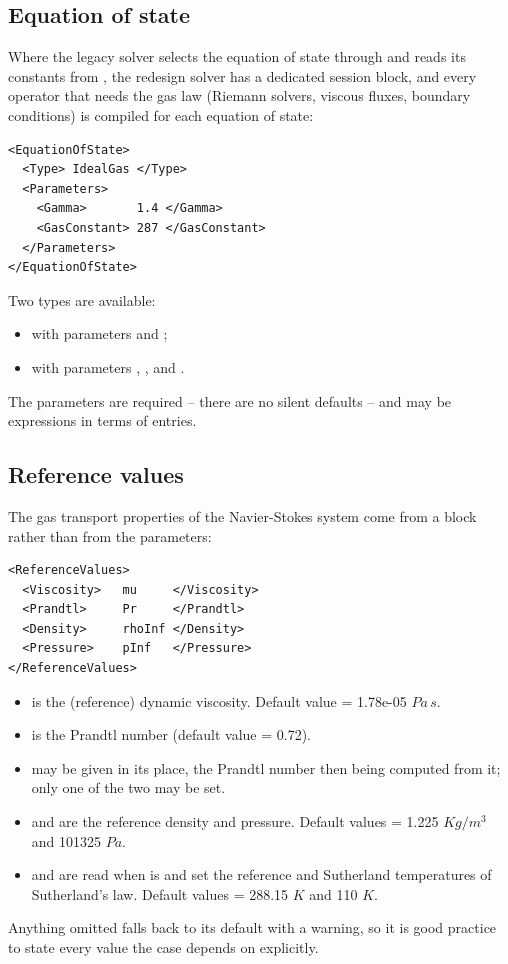 \subsection*{Equation of state}
Where the legacy solver selects the equation of state through
 and reads its constants from , the
redesign solver has a dedicated session block, and every operator that
needs the gas law (Riemann solvers, viscous fluxes, boundary
conditions) is compiled for each equation of state:
\begin{lstlisting}[style=XmlStyle]
<EquationOfState>
  <Type> IdealGas </Type>
  <Parameters>
    <Gamma>       1.4 </Gamma>
    <GasConstant> 287 </GasConstant>
  </Parameters>
</EquationOfState>
\end{lstlisting}
Two types are available:
\begin{itemize}
\item {} with parameters  and
  ;
\item {} with parameters ,
  ,  and .
\end{itemize}
The parameters are required -- there are no silent defaults -- and may be
expressions in terms of  entries.

\subsection*{Reference values}
The gas transport properties of the Navier-Stokes system come from a
 block rather than from the parameters:
\begin{lstlisting}[style=XmlStyle]
<ReferenceValues>
  <Viscosity>   mu     </Viscosity>
  <Prandtl>     Pr     </Prandtl>
  <Density>     rhoInf </Density>
  <Pressure>    pInf   </Pressure>
</ReferenceValues>
\end{lstlisting}
\begin{itemize}
\item {} is the (reference) dynamic viscosity. Default
  value = 1.78e-05 $Pa\,s$.
\item {} is the Prandtl number (default value = 0.72).
\item {} may be given in its place, the Prandtl
  number then being computed from it; only one of the two may be set.
\item {} and  are the reference density and
  pressure. Default values = 1.225 $Kg/m^{3}$ and 101325 $Pa$.
\item {} and  are read when
   is  and set the reference and
  Sutherland temperatures of Sutherland's law. Default values = 288.15 $K$
  and 110 $K$.
\end{itemize}
Anything omitted falls back to its default with a warning, so it is good
practice to state every value the case depends on explicitly.

